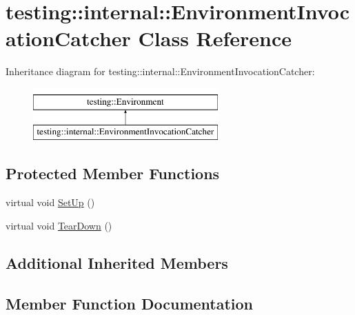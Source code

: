 \hypertarget{classtesting_1_1internal_1_1EnvironmentInvocationCatcher}{}\section{testing\+::internal\+::Environment\+Invocation\+Catcher Class Reference}
\label{classtesting_1_1internal_1_1EnvironmentInvocationCatcher}
Inheritance diagram for testing\+::internal\+::Environment\+Invocation\+Catcher\+:\begin{figure}[H]
\begin{center}
\leavevmode
\includegraphics[height=2.000000cm]{classtesting_1_1internal_1_1EnvironmentInvocationCatcher}
\end{center}
\end{figure}
\subsection*{Protected Member Functions}
\begin{DoxyCompactItemize}
\item 
virtual void \mbox{\hyperlink{classtesting_1_1internal_1_1EnvironmentInvocationCatcher_a325365b0ecfa71a4a767d7a1817c9663}{Set\+Up}} ()
\item 
virtual void \mbox{\hyperlink{classtesting_1_1internal_1_1EnvironmentInvocationCatcher_afc89ee0a8e32e6746a89fcc1682f62e9}{Tear\+Down}} ()
\end{DoxyCompactItemize}
\subsection*{Additional Inherited Members}


\subsection{Member Function Documentation}
\mbox{\label{classtesting_1_1internal_1_1EnvironmentInvocationCatcher_a325365b0ecfa71a4a767d7a1817c9663}} 
